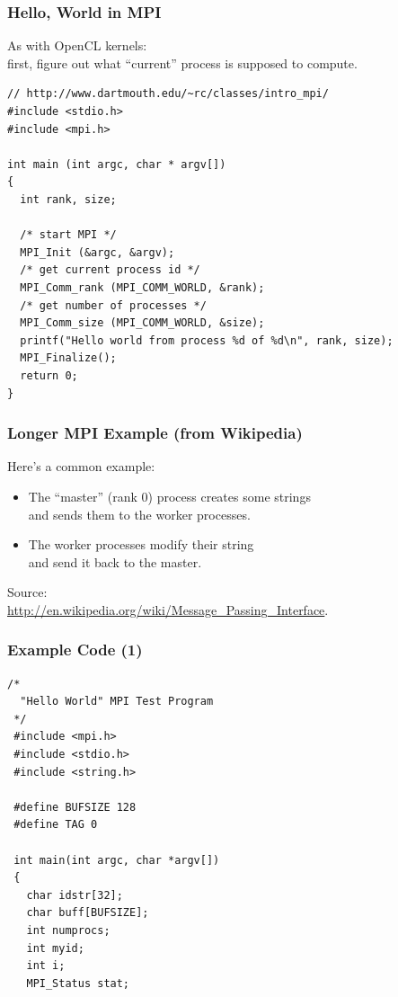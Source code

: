 \begin{frame}[fragile]
  \frametitle{Hello, World in MPI}
  
As with OpenCL kernels:\\
\quad first, figure out what ``current'' process is supposed to compute.\\

{\small
\begin{verbatim}
// http://www.dartmouth.edu/~rc/classes/intro_mpi/
#include <stdio.h>
#include <mpi.h>

int main (int argc, char * argv[])
{
  int rank, size;

  /* start MPI */
  MPI_Init (&argc, &argv);	
  /* get current process id */
  MPI_Comm_rank (MPI_COMM_WORLD, &rank);	
  /* get number of processes */
  MPI_Comm_size (MPI_COMM_WORLD, &size);	
  printf("Hello world from process %d of %d\n", rank, size);
  MPI_Finalize();
  return 0;
}
\end{verbatim}
}
  
\end{frame}

\begin{frame}
  \frametitle{Longer MPI Example (from Wikipedia)}
  

  Here's a common example:

  \begin{itemize}
    \item The ``master'' (rank 0) process creates some strings \\ \qquad and sends them
      to the worker processes.
    \item The worker processes modify their string \\ \qquad and send it back to the master.
  \end{itemize}

  Source:\\
  {\small \url{http://en.wikipedia.org/wiki/Message_Passing_Interface}}.

  
\end{frame}

\begin{frame}[fragile]
  \frametitle{Example Code (1)}
  

  \begin{lstlisting}
/*
  "Hello World" MPI Test Program
 */
 #include <mpi.h>
 #include <stdio.h>
 #include <string.h>
 
 #define BUFSIZE 128
 #define TAG 0
 
 int main(int argc, char *argv[])
 {
   char idstr[32];
   char buff[BUFSIZE];
   int numprocs;
   int myid;
   int i;
   MPI_Status stat;
  \end{lstlisting}
  
\end{frame}

